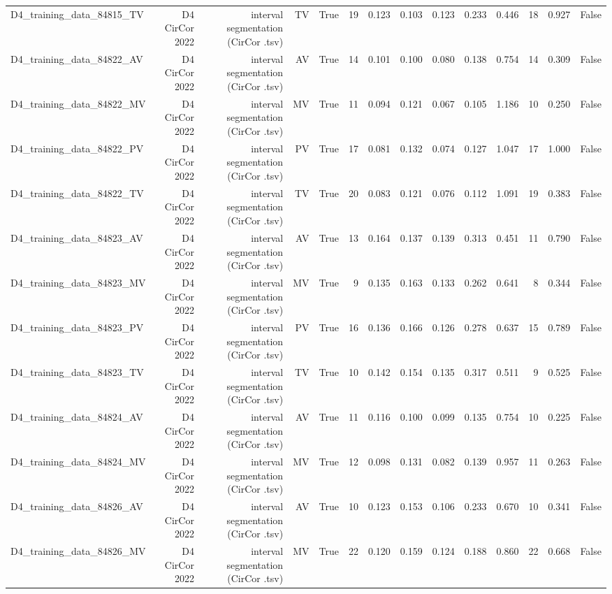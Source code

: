 \begin{table}[htbp]
\begin{tabular}{lrrrrrrrrrrrrr}
    D4\_training\_data\_84815\_TV & D4 CirCor 2022 & interval segmentation (CirCor .tsv) & TV & True & 19 & 0.123 & 0.103 & 0.123 & 0.233 & 0.446 & 18 & 0.927 & False \\
    D4\_training\_data\_84822\_AV & D4 CirCor 2022 & interval segmentation (CirCor .tsv) & AV & True & 14 & 0.101 & 0.100 & 0.080 & 0.138 & 0.754 & 14 & 0.309 & False \\
    D4\_training\_data\_84822\_MV & D4 CirCor 2022 & interval segmentation (CirCor .tsv) & MV & True & 11 & 0.094 & 0.121 & 0.067 & 0.105 & 1.186 & 10 & 0.250 & False \\
    D4\_training\_data\_84822\_PV & D4 CirCor 2022 & interval segmentation (CirCor .tsv) & PV & True & 17 & 0.081 & 0.132 & 0.074 & 0.127 & 1.047 & 17 & 1.000 & False \\
    D4\_training\_data\_84822\_TV & D4 CirCor 2022 & interval segmentation (CirCor .tsv) & TV & True & 20 & 0.083 & 0.121 & 0.076 & 0.112 & 1.091 & 19 & 0.383 & False \\
    D4\_training\_data\_84823\_AV & D4 CirCor 2022 & interval segmentation (CirCor .tsv) & AV & True & 13 & 0.164 & 0.137 & 0.139 & 0.313 & 0.451 & 11 & 0.790 & False \\
    D4\_training\_data\_84823\_MV & D4 CirCor 2022 & interval segmentation (CirCor .tsv) & MV & True & 9 & 0.135 & 0.163 & 0.133 & 0.262 & 0.641 & 8 & 0.344 & False \\
    D4\_training\_data\_84823\_PV & D4 CirCor 2022 & interval segmentation (CirCor .tsv) & PV & True & 16 & 0.136 & 0.166 & 0.126 & 0.278 & 0.637 & 15 & 0.789 & False \\
    D4\_training\_data\_84823\_TV & D4 CirCor 2022 & interval segmentation (CirCor .tsv) & TV & True & 10 & 0.142 & 0.154 & 0.135 & 0.317 & 0.511 & 9 & 0.525 & False \\
    D4\_training\_data\_84824\_AV & D4 CirCor 2022 & interval segmentation (CirCor .tsv) & AV & True & 11 & 0.116 & 0.100 & 0.099 & 0.135 & 0.754 & 10 & 0.225 & False \\
    D4\_training\_data\_84824\_MV & D4 CirCor 2022 & interval segmentation (CirCor .tsv) & MV & True & 12 & 0.098 & 0.131 & 0.082 & 0.139 & 0.957 & 11 & 0.263 & False \\
    D4\_training\_data\_84826\_AV & D4 CirCor 2022 & interval segmentation (CirCor .tsv) & AV & True & 10 & 0.123 & 0.153 & 0.106 & 0.233 & 0.670 & 10 & 0.341 & False \\
    D4\_training\_data\_84826\_MV & D4 CirCor 2022 & interval segmentation (CirCor .tsv) & MV & True & 22 & 0.120 & 0.159 & 0.124 & 0.188 & 0.860 & 22 & 0.668 & False \\

\end{tabular}
\end{table}

